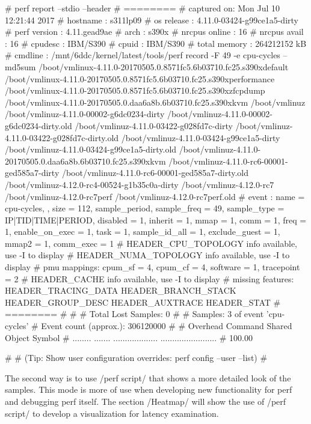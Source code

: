 \starttyping[]
# perf report --stdio --header
# ========
# captured on: Mon Jul 10 12:21:44 2017
# hostname : s311lp09
# os release : 4.11.0-03424-g99ce1a5-dirty
# perf version : 4.11.gead9ae
# arch : s390x
# nrcpus online : 16
# nrcpus avail : 16
# cpudesc : IBM/S390
# cpuid : IBM/S390
# total memory : 264212152 kB
# cmdline : /mnt/6ddc/kernel/latest/tools/perf record -F 49 -e cpu-cycles -- md5sum /boot/vmlinux-4.11.0-20170505.0.8571fc5.6b03710.fc25.s390xdefault /boot/vmlinux-4.11.0-20170505.0.8571fc5.6b03710.fc25.s390xperformance /boot/vmlinux-4.11.0-20170505.0.8571fc5.6b03710.fc25.s390xzfcpdump /boot/vmlinux-4.11.0-20170505.0.daa6a8b.6b03710.fc25.s390xkvm /boot/vmlinuz /boot/vmlinuz-4.11.0-00002-g6dc0234-dirty /boot/vmlinuz-4.11.0-00002-g6dc0234-dirty.old /boot/vmlinuz-4.11.0-03422-g028fd7c-dirty /boot/vmlinuz-4.11.0-03422-g028fd7c-dirty.old /boot/vmlinuz-4.11.0-03424-g99ce1a5-dirty /boot/vmlinuz-4.11.0-03424-g99ce1a5-dirty.old /boot/vmlinuz-4.11.0-20170505.0.daa6a8b.6b03710.fc25.s390xkvm /boot/vmlinuz-4.11.0-rc6-00001-ged585a7-dirty /boot/vmlinuz-4.11.0-rc6-00001-ged585a7-dirty.old /boot/vmlinuz-4.12.0-rc4-00524-g1b35c0a-dirty /boot/vmlinuz-4.12.0-rc7 /boot/vmlinuz-4.12.0-rc7perf /boot/vmlinuz-4.12.0-rc7perf.old
# event : name = cpu-cycles, , size = 112, { sample_period, sample_freq } = 49, sample_type = IP|TID|TIME|PERIOD, disabled = 1, inherit = 1, mmap = 1, comm = 1, freq = 1, enable_on_exec = 1, task = 1, sample_id_all = 1, exclude_guest = 1, mmap2 = 1, comm_exec = 1
# HEADER_CPU_TOPOLOGY info available, use -I to display
# HEADER_NUMA_TOPOLOGY info available, use -I to display
# pmu mappings: cpum_sf = 4, cpum_cf = 4, software = 1, tracepoint = 2
# HEADER_CACHE info available, use -I to display
# missing features: HEADER_TRACING_DATA HEADER_BRANCH_STACK HEADER_GROUP_DESC HEADER_AUXTRACE HEADER_STAT
# ========
#
#
# Total Lost Samples: 0
#
# Samples: 3  of event 'cpu-cycles'
# Event count (approx.): 306120000
#
# Overhead  Command  Shared Object        Symbol
# ........  .......  ...................  ........................
#
   100.00%


#
# (Tip: Show user configuration overrides: perf config --user --list)
#
\stoptyping

The second way is to use /perf script/ that shows a more detailed look of
the samples. This mode is more of use when developing new functionality for
perf and debugging perf itself. The section /Heatmap/ will show the use of
/perf script/ to develop a visualization for latency examination.

